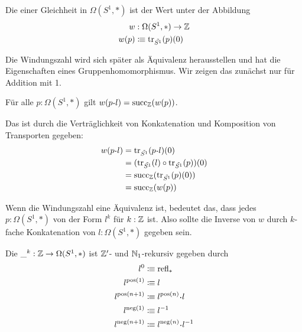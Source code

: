 \begin{definition}
  Die  einer Gleichheit in $\Omega(S^1,\ast)$ ist der Wert unter der Abbildung
  \begin{align*}
    w&:\Omega(S^1,\ast)\to \mathbb{Z} \\
    w(p)&\vcentcolon\mspace{-1.2mu}\equiv \mathrm{tr}_{\tilde{S^1}}(p)(0)
  \end{align*}
\end{definition}

Die Windungszahl wird sich später als Äquivalenz herausstellen und hat die Eigenschaften eines Gruppenhomomorphismus.
Wir zeigen das zunächst nur für Addition mit 1.

\begin{bemerkung}
  \label{bem:hom-windungszahl}
  Für alle $p:\Omega(S^1,\ast)$ gilt $w(p\kon l)=\mathrm{succ}_{\Z}(w(p))$.
\end{bemerkung}
\begin{beweis}
  Das ist durch die Verträglichkeit von Konkatenation und Komposition von Transporten gegeben:
  \begin{align*}
    w(p\kon l)&=\transp_{\tilde{S^1}}(p\kon l)(0) \\
              &=(\transp_{\tilde{S^1}}(l)\circ\transp_{\tilde{S^1}}(p))(0) \\
              &=\mathrm{succ}_\Z(\transp_{\tilde{S^1}}(p)(0)) \\
    &=\mathrm{succ}_\Z(w(p)) 
  \end{align*}
\end{beweis}

Wenn die Windungszahl eine Äquivalenz ist, bedeutet das, dass jedes $p:\Omega(S^1,\ast)$ von der Form $l^k$ für $k:\mathbb{Z}$ ist.
Also sollte die Inverse von $w$ durch $k$-fache Konkatenation von $l:\Omega(S^1,\ast)$ gegeben sein.

\begin{definition}
  Die  $\_^k:\mathbb{Z}\to\Omega(S^1,\ast)$ ist $\mathbb{Z}'$- und $\mathbb{N}_1$-rekursiv gegeben durch
  \begin{align*}
    l^0&\colonequiv \refl_\ast \\
    l^{\mathrm{pos}(1)}&\colonequiv l \\
    l^{\mathrm{pos}(n+1)}&\colonequiv l^{\mathrm{pos}(n)}\kon l \\
    l^{\mathrm{neg}(1)}&\colonequiv l^{-1} \\
    l^{\mathrm{neg}(n+1)}&\colonequiv l^{\mathrm{neg}(n)}\kon l^{-1}
  \end{align*}
\end{definition}

